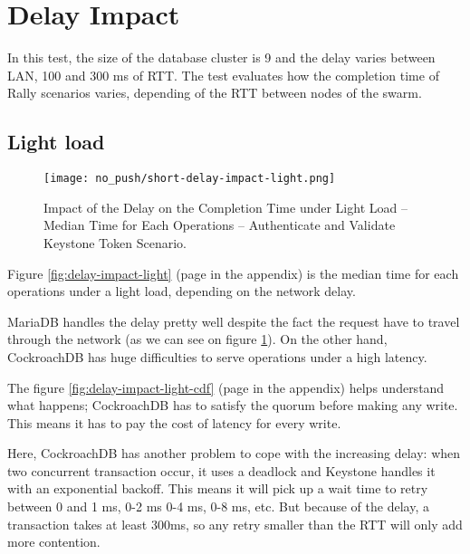 \section{Delay Impact}

In this test, the size of the database cluster is 9 and the delay varies between LAN, 100 and 300 ms of RTT. The test evaluates how the completion time of Rally scenarios varies, depending of the RTT between nodes of the swarm.



\subsection{Light load}

\begin{figure}[H]
  \vspace{-10pt}
  \centering
  \centerline{\texttt{[image: no\_push/short-delay-impact-light.png]}}
  \vspace{-5pt}
  \caption{Impact of the Delay on the Completion Time under Light Load – Median Time for Each Operations – Authenticate and Validate Keystone Token Scenario.}
  \vspace{-5pt}
  \label{fig:short-delay-impact-light}
\end{figure}

Figure \ref{fig:delay-impact-light} (page \pageref{fig:delay-impact-light} in the appendix) is the median time for each operations under a light load, depending on the network delay.%

MariaDB handles the delay pretty well despite the fact the request have to travel through the network (as we can see on figure \ref{fig:short-delay-impact-light}). On the other hand, CockroachDB has huge difficulties to serve operations under a high latency.


The figure \ref{fig:delay-impact-light-cdf} (page \pageref{fig:delay-impact-light-cdf} in the appendix) helps understand what happens; CockroachDB has to satisfy the quorum before making any write. This means it has to pay the cost of latency for every write.

Here, CockroachDB has another problem to cope with the increasing delay: when two concurrent transaction occur, it uses a deadlock and Keystone handles it with an exponential backoff. This means it will pick up a wait time to retry between 0 and 1 ms, 0-2 ms 0-4 ms, 0-8 ms, etc. But because of the delay, a transaction takes at least 300ms, so any retry smaller than the RTT will only add more contention.

